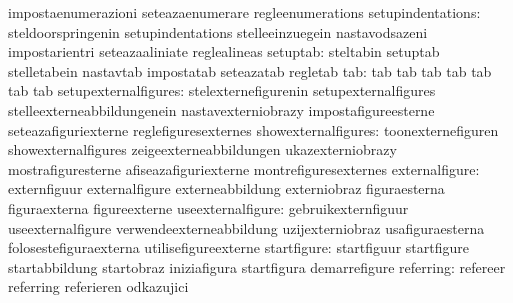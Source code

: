                                   impostaenumerazioni              seteazaenumerare
                                  regleenumerations
               setupindentations: steldoorspringenin               setupindentations
                                  stelleeinzuegein                 nastavodsazeni
                                  impostarientri                   seteazaaliniate
                                  reglealineas
                        setuptab: steltabin                        setuptab
                                  stelletabein                     nastavtab
                                  impostatab                       seteazatab
                                  regletab
                             tab: tab                              tab
                                  tab                              tab
                                  tab                              tab
                                  tab
            setupexternalfigures: stelexternefigurenin             setupexternalfigures
                                  stelleexterneabbildungenein      nastavexterniobrazy
                                  impostafigureesterne             seteazafiguriexterne
                                  reglefiguresexternes
             showexternalfigures: toonexternefiguren               showexternalfigures
                                  zeigeexterneabbildungen          ukazexterniobrazy
                                  mostrafiguresterne               afiseazafiguriexterne
                                  montrefiguresexternes
                  externalfigure: externfiguur                     externalfigure
                                  externeabbildung                 externiobraz
                                  figuraesterna                    figuraexterna
                                  figureexterne
               useexternalfigure: gebruikexternfiguur              useexternalfigure
                                  verwendeexterneabbildung         uzijexterniobraz
                                  usafiguraesterna                 folosestefiguraexterna
                                  utilisefigureexterne
                     startfigure: startfiguur                      startfigure
                                  startabbildung                   startobraz
                                  iniziafigura                     startfigura
                                  demarrefigure
                       referring: refereer                         referring
                                  referieren                       odkazujici
